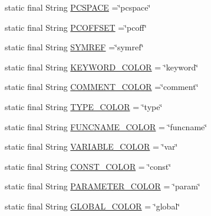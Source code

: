 \begin{DoxyCompactItemize}
static final String \mbox{\hyperlink{classghidra_1_1app_1_1decompiler_1_1_clang_x_m_l_aa6184a2e13be9016b44933b8d3f3e98a}{P\+C\+S\+P\+A\+CE}} =\char`\"{}pcspace\char`\"{}
\item 
static final String \mbox{\hyperlink{classghidra_1_1app_1_1decompiler_1_1_clang_x_m_l_a6883380222c0a5e112da0f4958c001cc}{P\+C\+O\+F\+F\+S\+ET}} =\char`\"{}pcoff\char`\"{}
\item 
static final String \mbox{\hyperlink{classghidra_1_1app_1_1decompiler_1_1_clang_x_m_l_affdc2727264d303811c7293e4d6ce68c}{S\+Y\+M\+R\+EF}} =\char`\"{}symref\char`\"{}
\item 
static final String \mbox{\hyperlink{classghidra_1_1app_1_1decompiler_1_1_clang_x_m_l_aea4e49adfd101be76915c74614352101}{K\+E\+Y\+W\+O\+R\+D\+\_\+\+C\+O\+L\+OR}} = \char`\"{}keyword\char`\"{}
\item 
static final String \mbox{\hyperlink{classghidra_1_1app_1_1decompiler_1_1_clang_x_m_l_a8572cbfd3d380e49ec0ef9907a296b19}{C\+O\+M\+M\+E\+N\+T\+\_\+\+C\+O\+L\+OR}} =\char`\"{}comment\char`\"{}
\item 
static final String \mbox{\hyperlink{classghidra_1_1app_1_1decompiler_1_1_clang_x_m_l_a84f6447eeaf5e3b98eb0d92f718169f3}{T\+Y\+P\+E\+\_\+\+C\+O\+L\+OR}} = \char`\"{}type\char`\"{}
\item 
static final String \mbox{\hyperlink{classghidra_1_1app_1_1decompiler_1_1_clang_x_m_l_a662c054609a801110dbef9551d5988ac}{F\+U\+N\+C\+N\+A\+M\+E\+\_\+\+C\+O\+L\+OR}} = \char`\"{}funcname\char`\"{}
\item 
static final String \mbox{\hyperlink{classghidra_1_1app_1_1decompiler_1_1_clang_x_m_l_a0027322eee08d954d53d2c72e8ef9ee9}{V\+A\+R\+I\+A\+B\+L\+E\+\_\+\+C\+O\+L\+OR}} = \char`\"{}var\char`\"{}
\item 
static final String \mbox{\hyperlink{classghidra_1_1app_1_1decompiler_1_1_clang_x_m_l_a4f4f49ec67c6d718fcc039a397116181}{C\+O\+N\+S\+T\+\_\+\+C\+O\+L\+OR}} = \char`\"{}const\char`\"{}
\item 
static final String \mbox{\hyperlink{classghidra_1_1app_1_1decompiler_1_1_clang_x_m_l_ac46d109eeeb5ed250c953fc624a9fe35}{P\+A\+R\+A\+M\+E\+T\+E\+R\+\_\+\+C\+O\+L\+OR}} = \char`\"{}param\char`\"{}
\item 
static final String \mbox{\hyperlink{classghidra_1_1app_1_1decompiler_1_1_clang_x_m_l_af77947eba3cbc8692db363294a52329d}{G\+L\+O\+B\+A\+L\+\_\+\+C\+O\+L\+OR}} = \char`\"{}global\char`\"{}
\end{DoxyCompactItemize}


